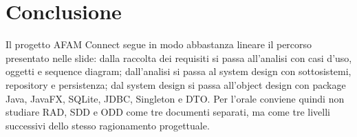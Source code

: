 ﻿\documentclass[11pt,a4paper]{article}
\begin{document}
\section{Conclusione}

Il progetto AFAM Connect segue in modo abbastanza lineare il percorso presentato nelle
slide: dalla raccolta dei requisiti si passa all'analisi con casi d'uso, oggetti e sequence
diagram; dall'analisi si passa al system design con sottosistemi, repository e persistenza;
dal system design si passa all'object design con package Java, JavaFX, SQLite, JDBC,
Singleton e DTO. Per l'orale conviene quindi non studiare RAD, SDD e ODD come tre
documenti separati, ma come tre livelli successivi dello stesso ragionamento progettuale.
\end{document}
